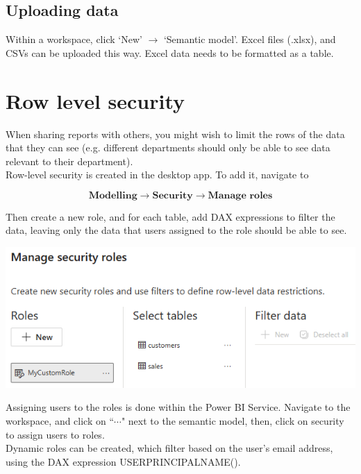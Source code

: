 \documentclass[10pt, openany, twocolumn]{book}
\begin{document}
\subsection*{Uploading data}

Within a workspace, click `New' $\rightarrow$ `Semantic model'. Excel files (.xlsx), and CSVs can be uploaded this way. Excel data needs to be formatted as a table.

\section{Row level security}

When sharing reports with others, you might wish to limit the rows of the data that they can see (e.g. different departments should only be able to see data relevant to their department).\\

Row-level security is created in the desktop app. To add it, navigate to 

$$\textbf{Modelling} \rightarrow \textbf{Security} \rightarrow \textbf{Manage roles}$$

Then create a new role, and for each table, add DAX expressions to filter the data, leaving only the data that users assigned to the role should be able to see. \\

\begin{center}
    \includegraphics[width = 1\columnwidth]{images/row_level_security.png}
\end{center}

Assigning users to the roles is done within the Power BI Service. Navigate to the workspace, and click on ``$\cdots$" next to the semantic model, then, click on security to assign users to roles.\\

Dynamic roles can be created, which filter based on the user's email address, using the DAX expression USERPRINCIPALNAME().
\end{document}
